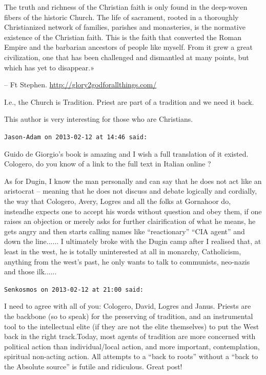 \begin{footnotesize}
\begin{sffamily}
The truth and richness of the Christian faith is only found in the deep-woven fibers of the historic Church. The life of sacrament, rooted in a thoroughly Christianized network of families, parishes and monasteries, is the normative existence of the Christian faith. This is the faith that converted the Roman Empire and the barbarian ancestors of people like myself. From it grew a great civilization, one that has been challenged and dismantled at many points, but which has yet to disappear.»

-- Ft Stephen. \url{http://glory2godforallthings.com/}

I.e., the Church is Tradition. Priest are part of a tradition and we need it back.

This author is very interesting for those who are Christians.

\hfill

\texttt{Jason-Adam on 2013-02-12 at 14:46 said:}

Guido de Giorgio's book is amazing and I wish a full translation of it existed. Cologero, do you know of a link to the full text in Italian online ?

As for Dugin, I know the man personally and can say that he does not act like an aristocrat -- meaning that he does not discuss and debate logically and cordially, the way that Cologero, Avery, Logres and all the folks at Gornahoor do, insteadhe expects one to accept his words without question and obey them, if one raises an objection or merely asks for further clairification of what he means, he gets angry and then starts calling names like ``reactionary'' ``CIA agent'' and down the line...... I ultimately broke with the Dugin camp after I realised that, at least in the west, he is totally uninterested at all in monarchy, Catholicism, anything from the west's past, he only wants to talk to communists, neo-nazis and those ilk...... 

\hfill

\texttt{Senkosmos on 2013-02-12 at 21:00 said:}

I need to agree with all of you: Cologero, David, Logres and Janus. Priests are the backbone (so to speak) for the preserving of tradition, and an instrumental tool to the intellectual elite (if they are not the elite themselves) to put the West back in the right track.Today, most agents of tradition are more concerned with political action than individual/local action, and more important, contemplation, spiritual non-acting action. All attempts to a ``back to roots'' without a ``back to the Absolute source'' is futile and ridiculous. Great post!


\end{sffamily}
\end{footnotesize}
